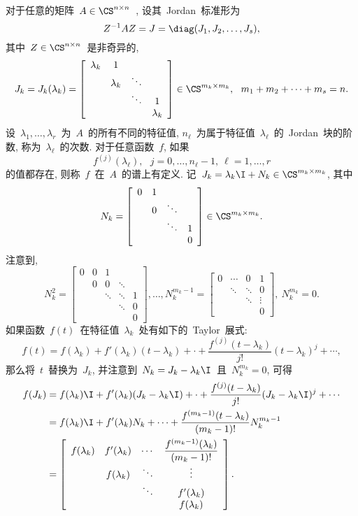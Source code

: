对于任意的矩阵~$A \in \CS^{n\times n}$~, 设其~Jordan~标准形为
\begin{equation}
\label{eq:JorCanForm} Z^{-1}AZ = J = \diag(J_1,J_2,\ldots,J_s),
\end{equation}
其中~$Z\in\CS^{n\times n}$~是非奇异的,
$$
J_k = J_k(\lambda_k) = \left[\begin{array}{cccc} \lambda_k & 1 & &  \\
 & \lambda_k & \ddots & \\
 &  & \ddots & 1 \\
 &  &  & \lambda_k \end{array}\right] \in \CS^{m_k\times m_k}, \ \
 m_1 + m_2 + \cdots + m_s = n.
$$
设~$\lambda_1,\ldots, \lambda_r$~为~$A$~的所有不同的特征值,
$n_\ell$~为属于特征值~$\lambda_\ell$~的~Jordan~块的阶数,
称为~$\lambda_\ell$~的次数. 对于任意函数~$f$, 如果
$$
f^{(j)}(\lambda_\ell), \ \ \ j = 0, \ldots, n_\ell-1,\ \ell =
1,\ldots, r
$$
的值都存在, 则称~$f$~在~$A$~的谱上有定义. 记~$J_k = \lambda_k\I +
N_k \in \CS^{m_k\times m_k}$, 其中
$$
N_k = \left[\begin{array}{cccc} 0 & 1 & &  \\
 & 0 & \ddots & \\
 &  & \ddots & 1 \\
 &  &  & 0 \end{array}\right] \in \CS^{m_k\times m_k}.
$$
注意到,
$$
N_k^2 = \left[\begin{array}{ccccc} 0 & 0 & 1 & & \\
 & 0 & 0 & \ddots & \\
 &  & \ddots & \ddots & 1 \\
  &  &  & \ddots & 0 \\
 &  &  & & 0 \end{array}\right], \ldots,
 N_k^{m_k-1} = \left[\begin{array}{cccc} 0  & \cdots & 0 & 1 \\
  & \ddots & \ddots & 0\\
  &  & \ddots & \vdots \\
  &  & & 0 \end{array}\right],\  N_k^{m_k} = 0.
$$
如果函数~$f(t)$~在特征值~$\lambda_k$~处有如下的~Taylor~展式:
$$
f(t) = f(\lambda_k) + f'(\lambda_k)(t-\lambda_k) + \cdot +
\frac{f^{(j)}(t-\lambda_k)}{j!} (t-\lambda_k)^j + \cdots,
$$
那么将~$t$~替换为~$J_k$, 并注意到~$N_k = J_k -
\lambda_k\I$~且~$N_k^{m_k} = 0$, 可得
\begin{align}
f(J_k) & = f(\lambda_k)\I + f'(\lambda_k)(J_k - \lambda_k\I) + \cdot
+ \frac{f^{(j)}(t-\lambda_k)}{j!} (J_k - \lambda_k\I)^j + \cdots
\nonumber\\
& = f(\lambda_k)\I + f'(\lambda_k) N_k + \cdots +
\frac{f^{(m_k-1)}(t-\lambda_k)}{(m_k-1)!}N_k^{m_k-1} \nonumber\\
& = \left[\begin{array}{cccc} f(\lambda_k) & f'(\lambda_k) & \cdots & \displaystyle \frac{f^{(m_k-1)}(\lambda_k)}{(m_k-1)!} \\
 & f(\lambda_k) & \ddots & \vdots\\
 &  & \ddots & f'(\lambda_k) \\
 &  &  & f(\lambda_k) \end{array}\right] \label{eq:f(Jk)}.
\end{align}
